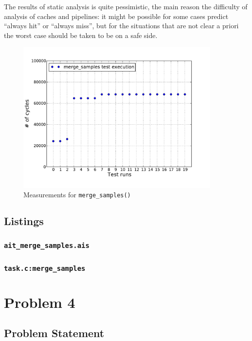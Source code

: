 \documentclass[12pt,a4paper,titlepage,oneside]{article}
\begin{document}
\begin{itemize}
  The results of static analysis is quite pessimistic, the main reason
  the difficulty of analysis of caches and pipelines: it might be
  possible for some cases predict ``always hit'' or ``always miss'',
  but for the situations that are not clear a priori the worst case
  should be taken to be on a safe side.

\begin{figure}%
  \centering
  \includegraphics[width=4in]{q3_2_merge_samples}
  \caption
  {Measurements for \texttt{merge\_samples()}}
	\label{fig:mergeSamples}
\end{figure}

\end{itemize}

\subsection{Listings}
\subsubsection{\texttt{ait\_merge\_samples.ais}}



\subsubsection{\texttt{task.c:merge\_samples}}



\newpage
\section{Problem 4}

\subsection{Problem Statement}

\end{document}
